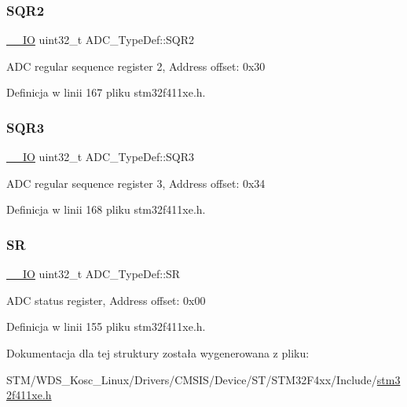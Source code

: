 \subsubsection{\texorpdfstring{S\+Q\+R2}{SQR2}}
{\footnotesize\ttfamily \hyperlink{core__sc300_8h_aec43007d9998a0a0e01faede4133d6be}{\+\_\+\+\_\+\+IO} uint32\+\_\+t A\+D\+C\+\_\+\+Type\+Def\+::\+S\+Q\+R2}

A\+DC regular sequence register 2, Address offset\+: 0x30 

Definicja w linii 167 pliku stm32f411xe.\+h.

\mbox{\label{struct_a_d_c___type_def_a51dbdba74c4d3559157392109af68fc6}} 
\subsubsection{\texorpdfstring{S\+Q\+R3}{SQR3}}
{\footnotesize\ttfamily \hyperlink{core__sc300_8h_aec43007d9998a0a0e01faede4133d6be}{\+\_\+\+\_\+\+IO} uint32\+\_\+t A\+D\+C\+\_\+\+Type\+Def\+::\+S\+Q\+R3}

A\+DC regular sequence register 3, Address offset\+: 0x34 

Definicja w linii 168 pliku stm32f411xe.\+h.

\mbox{\label{struct_a_d_c___type_def_a9745df96e98f3cdc2d05ccefce681f64}} 
\subsubsection{\texorpdfstring{SR}{SR}}
{\footnotesize\ttfamily \hyperlink{core__sc300_8h_aec43007d9998a0a0e01faede4133d6be}{\+\_\+\+\_\+\+IO} uint32\+\_\+t A\+D\+C\+\_\+\+Type\+Def\+::\+SR}

A\+DC status register, Address offset\+: 0x00 

Definicja w linii 155 pliku stm32f411xe.\+h.



Dokumentacja dla tej struktury została wygenerowana z pliku\+:\begin{DoxyCompactItemize}
\item 
S\+T\+M/\+W\+D\+S\+\_\+\+Kosc\+\_\+\+Linux/\+Drivers/\+C\+M\+S\+I\+S/\+Device/\+S\+T/\+S\+T\+M32\+F4xx/\+Include/\hyperlink{stm32f411xe_8h}{stm32f411xe.\+h}\end{DoxyCompactItemize}

